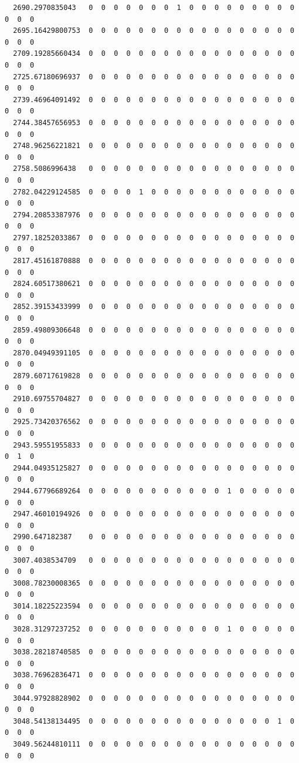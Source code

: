\documentclass[
  letterpaper,
  DIV=11,
  numbers=noendperiod]{scrartcl}
\begin{document}
\begin{verbatim}
  2690.2970835043   0  0  0  0  0  0  0  1  0  0  0  0  0  0  0  0  0  0  0  0
  2695.16429800753  0  0  0  0  0  0  0  0  0  0  0  0  0  0  0  0  0  0  0  0
  2709.19285660434  0  0  0  0  0  0  0  0  0  0  0  0  0  0  0  0  0  0  0  0
  2725.67180696937  0  0  0  0  0  0  0  0  0  0  0  0  0  0  0  0  0  0  0  0
  2739.46964091492  0  0  0  0  0  0  0  0  0  0  0  0  0  0  0  0  0  0  0  0
  2744.38457656953  0  0  0  0  0  0  0  0  0  0  0  0  0  0  0  0  0  0  0  0
  2748.96256221821  0  0  0  0  0  0  0  0  0  0  0  0  0  0  0  0  0  0  0  0
  2758.5086996438   0  0  0  0  0  0  0  0  0  0  0  0  0  0  0  0  0  0  0  0
  2782.04229124585  0  0  0  0  1  0  0  0  0  0  0  0  0  0  0  0  0  0  0  0
  2794.20853387976  0  0  0  0  0  0  0  0  0  0  0  0  0  0  0  0  0  0  0  0
  2797.18252033867  0  0  0  0  0  0  0  0  0  0  0  0  0  0  0  0  0  0  0  0
  2817.45161870888  0  0  0  0  0  0  0  0  0  0  0  0  0  0  0  0  0  0  0  0
  2824.60517380621  0  0  0  0  0  0  0  0  0  0  0  0  0  0  0  0  0  0  0  0
  2852.39153433999  0  0  0  0  0  0  0  0  0  0  0  0  0  0  0  0  0  0  0  0
  2859.49809306648  0  0  0  0  0  0  0  0  0  0  0  0  0  0  0  0  0  0  0  0
  2870.04949391105  0  0  0  0  0  0  0  0  0  0  0  0  0  0  0  0  0  0  0  0
  2879.60717619828  0  0  0  0  0  0  0  0  0  0  0  0  0  0  0  0  0  0  0  0
  2910.69755704827  0  0  0  0  0  0  0  0  0  0  0  0  0  0  0  0  0  0  0  0
  2925.73420376562  0  0  0  0  0  0  0  0  0  0  0  0  0  0  0  0  0  0  0  0
  2943.59551955833  0  0  0  0  0  0  0  0  0  0  0  0  0  0  0  0  0  0  1  0
  2944.04935125827  0  0  0  0  0  0  0  0  0  0  0  0  0  0  0  0  0  0  0  0
  2944.67796689264  0  0  0  0  0  0  0  0  0  0  0  1  0  0  0  0  0  0  0  0
  2947.46010194926  0  0  0  0  0  0  0  0  0  0  0  0  0  0  0  0  0  0  0  0
  2990.647182387    0  0  0  0  0  0  0  0  0  0  0  0  0  0  0  0  0  0  0  0
  3007.4038534709   0  0  0  0  0  0  0  0  0  0  0  0  0  0  0  0  0  0  0  0
  3008.78230008365  0  0  0  0  0  0  0  0  0  0  0  0  0  0  0  0  0  0  0  0
  3014.18225223594  0  0  0  0  0  0  0  0  0  0  0  0  0  0  0  0  0  0  0  0
  3028.31297237252  0  0  0  0  0  0  0  0  0  0  0  1  0  0  0  0  0  0  0  0
  3038.28218740585  0  0  0  0  0  0  0  0  0  0  0  0  0  0  0  0  0  0  0  0
  3038.76962836471  0  0  0  0  0  0  0  0  0  0  0  0  0  0  0  0  0  0  0  0
  3044.97928828902  0  0  0  0  0  0  0  0  0  0  0  0  0  0  0  0  0  0  0  0
  3048.54138134495  0  0  0  0  0  0  0  0  0  0  0  0  0  0  0  1  0  0  0  0
  3049.56244810111  0  0  0  0  0  0  0  0  0  0  0  0  0  0  0  0  0  0  0  0

\end{verbatim}
\end{document}
